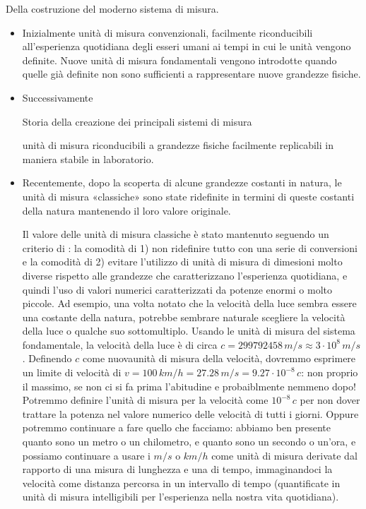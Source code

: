 \documentclass[letterpaper,10pt,italian]{jupyterBook}
\begin{document}
\sphinxAtStartPar
{} Della costruzione del moderno sistema di misura.
\begin{itemize}
\item {} 
\sphinxAtStartPar
Inizialmente unità di misura convenzionali, facilmente riconducibili all’esperienza quotidiana degli esseri umani ai tempi in cui le unità vengono definite. Nuove unità di misura fondamentali vengono introdotte quando quelle già definite non sono sufficienti a rappresentare nuove grandezze fisiche.

\item {} 
\sphinxAtStartPar
Successivamente%
\begin{footnote}[4]\sphinxAtStartFootnote
Storia della creazione dei principali sistemi di misura  
%
\end{footnote} unità di misura riconducibili a grandezze fisiche facilmente replicabili in maniera stabile in laboratorio.

\item {} 
\sphinxAtStartPar
Recentemente, dopo la scoperta di alcune grandezze costanti in natura, le unità di misura «classiche» sono state ri\sphinxhyphen{}definite in termini di queste costanti della natura mantenendo il loro valore originale.%
\begin{footnote}[5]\sphinxAtStartFootnote
Il valore delle unità di misura classiche è stato mantenuto seguendo un criterio di : la comodità di 1) non ridefinire tutto con una serie di conversioni e la comodità di 2) evitare l’utilizzo di unità di misura di dimesioni molto diverse rispetto alle grandezze che caratterizzano l’esperienza quotidiana, e quindi l’uso di valori numerici caratterizzati da potenze enormi o molto piccole. Ad esempio, una volta notato che la velocità della luce sembra essere una costante della natura, potrebbe sembrare naturale scegliere la velocità della luce o qualche suo sottomultiplo. Usando le unità di misura del sistema fondamentale, la velocità della luce è di circa \(c = 299792458 \, m/s \approx 3 \cdot 10^{8} \, m/s\). Definendo \(c\) come nuovaunità di misura della velocità, dovremmo esprimere un limite di velocità di \(v = 100 \, km/h = 27.28 \, m/s = 9.27 \cdot 10^{-8} \, c\): non proprio il massimo, se non ci si fa prima l’abitudine \sphinxhyphen{} e probaiblmente nemmeno dopo! Potremmo definire l’unità di misura per la velocità come \(10^{-8} \, c\) per non dover trattare la potenza nel valore numerico delle velocità di tutti i giorni. Oppure potremmo continuare a fare quello che facciamo: abbiamo ben presente quanto sono un metro o un chilometro, e quanto sono un secondo o un’ora, e possiamo continuare a usare i \(m/s\) o \(km/h\) come unità di misura derivate dal rapporto di una misura di lunghezza e una di tempo, immaginandoci la velocità come distanza percorsa in un intervallo di tempo (quantificate in unità di misura intelligibili per l’esperienza nella nostra vita quotidiana).
%
\end{footnote}

\end{itemize}
\end{document}
